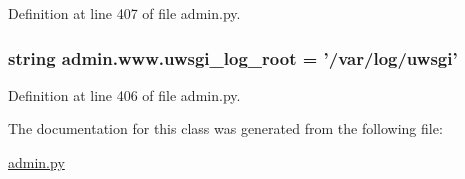 Definition at line 407 of file admin.\-py.

\hypertarget{classadmin_1_1www_a5ea11af52a64e25886b747ac675827a5}{
\subsubsection[{uwsgi\-\_\-log\-\_\-root}]{\setlength{\rightskip}{0pt plus 5cm}string admin.\-www.\-uwsgi\-\_\-log\-\_\-root = '/var/log/{\bf uwsgi}'\hspace{0.3cm}{\ttfamily [static]}}}\label{classadmin_1_1www_a5ea11af52a64e25886b747ac675827a5}


Definition at line 406 of file admin.\-py.



The documentation for this class was generated from the following file\-:\begin{DoxyCompactItemize}
\item 
\hyperlink{admin_8py}{admin.\-py}\end{DoxyCompactItemize}
